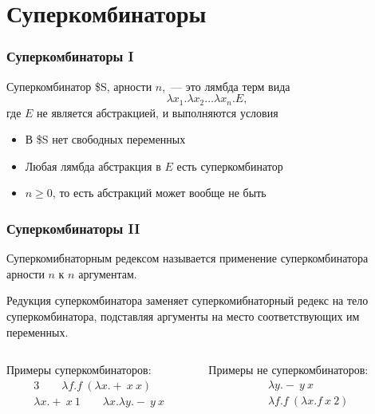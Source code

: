 \section{Суперкомбинаторы}

\begin{frame}
    \frametitle{Суперкомбинаторы I}

    \begin{definition}
        Суперкомбинатор \${}S, арности $n$,~--- это лямбда терм вида
        \[\lambda x_1. \lambda x_2 \dots \lambda x_n. E,\]
        где $E$ не является абстракцией, и выполняются условия
        \begin{itemize}
            \item В \${}S нет свободных переменных
            \item Любая лямбда абстракция в $E$ есть суперкомбинатор
            \item $n \ge 0$, то есть абстракций может вообще не быть
        \end{itemize}
    \end{definition}

\end{frame}

\begin{frame}
    \frametitle{Суперкомбинаторы II}

    \begin{definition}
        Суперкомибнаторным редексом называется применение суперкомбинатора арности $n$ к $n$ аргументам.

        Редукция суперкомбинатора заменяет суперкомибнаторный редекс на тело суперкомбинатора, подставляя аргументы на место соответствующих им переменных.
    \end{definition}

    \begin{columns}
        \begin{column}{0.5\textwidth}
            Примеры суперкомбинаторов:
            \begin{gather*}
                3 \qquad \lambda f. f\ (\lambda x. +\ x\ x) \\
                \lambda x.+\ x\ 1 \qquad \lambda x. \lambda y.-\ y\ x
            \end{gather*}
        \end{column}
        \begin{column}{0.5\textwidth}
            Примеры не суперкомбинаторов:
            \begin{gather*}
                \lambda y.-\ y\ x\\
                \lambda f.f\ (\lambda x.f\ x\ 2)
            \end{gather*}
        \end{column}
    \end{columns}

\end{frame}

